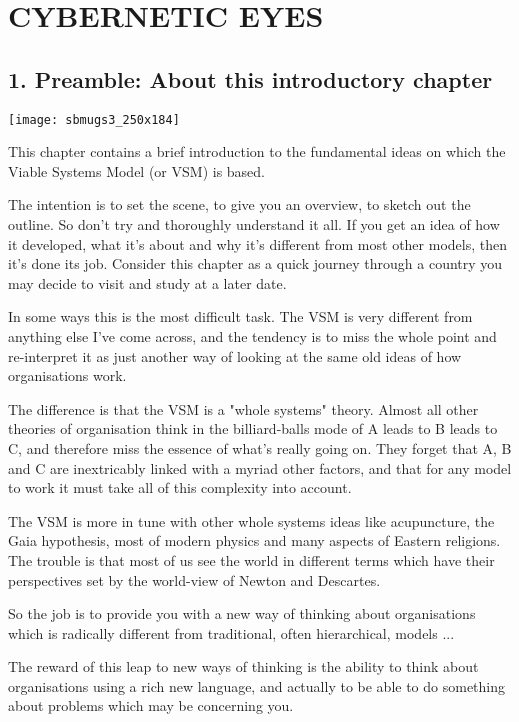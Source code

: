 \chapter{CYBERNETIC EYES}\label{CYBERNETIC EYES}
\section*{1. Preamble: About this introductory chapter}
\begin{center}
\texttt{[image: sbmugs3\_250x184]}
\end{center}

This chapter contains a brief introduction to the fundamental ideas on which the Viable Systems Model (or VSM) is based.

The intention is to set the scene, to give you an overview, to sketch out the outline. So don't try and thoroughly understand it all. If you get an idea of how it developed, what it's about and why it's different from most other models, then it's done its job. Consider this chapter as a quick journey through a country you may decide to visit and study at a later date.

In some ways this is the most difficult task. The VSM is very different from anything else I've come across, and the tendency is to miss the whole point and re-interpret it as just another way of looking at the same old ideas of how organisations work.

The difference is that the VSM is a "whole systems" theory. Almost all other theories of organisation think in the billiard-balls mode of A leads to B leads to C, and therefore miss the essence of what's really going on. They forget that A, B and C are inextricably linked with a myriad other factors, and that for any model to work it must take all of this complexity into account.

The VSM is more in tune with other whole systems ideas like acupuncture, the Gaia hypothesis, most of modern physics and many aspects of Eastern religions. The trouble is that most of us see the world in different terms which have their perspectives set by the world-view of Newton and Descartes.

So the job is to provide you with a new way of thinking about organisations which is radically different from traditional, often hierarchical, models ...

The reward of this leap to new ways of thinking is the ability to think about organisations using a rich new language, and actually to be able to do something about problems which may be concerning you.

